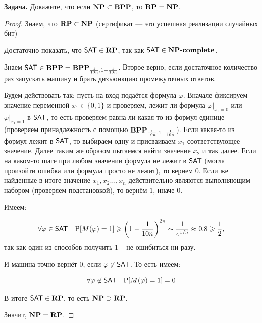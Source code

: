 \textbf{Задача.} Докажите, что если $\textbf{NP} \subset \textbf{BPP}$, то $\textbf{RP} = \textbf{NP}$.

\begin{proof}
Знаем, что $\textbf{RP} \subset \textbf{NP}$ (сертификат --- это успешная реализации случайных бит)

Достаточно показать, что $\mathsf{SAT} \in \textbf{RP}$, так как $\mathsf{SAT} \in \textbf{NP-complete}$.

Знаем $\mathsf{SAT} \in \textbf{BPP} = \textbf{BPP}_{\frac{1}{10n}, 1 - \frac{1}{10n}}$. Второе верно, если достаточное количество раз запускать машину и брать дизъюнкцию промежуточных ответов.

Будем действовать так:
пусть на вход подаётся формула $\varphi$. Вначале фиксируем значение переменной $x_1 \in \{0, 1\}$ и проверяем, лежит ли формула $\varphi|_{x_1 = 0}$ или $\varphi|_{x_1 = 1}$ в $\mathsf{SAT}$, то есть проверяем равна ли какая-то из формул единице (проверяем принадлежность с помощью $\textbf{BPP}_{\frac{1}{10n}, 1 - \frac{1}{10n}}$). Если какая-то из формул лежит в $\mathsf{SAT}$, то выбираем одну и присваиваем $x_1$ соответствующее значение. Далее таким же образом пытаемся найти значение $x_2$ и так далее. Если на каком-то шаге при любом значении формула не лежит в $\mathsf{SAT}$ (могла произойти ошибка или формула просто не лежит), то вернем $0$. Если же найденные в итоге значение $x_1,x_2\ldots,x_n$ действительно являются выполняющим набором (проверяем подстановкой), то вернём $1$, иначе $0$.

Имеем:

\[\forall \varphi \in \mathsf{SAT} \quad \mathrm{P}[M(\varphi) = 1] \geqslant \left(1-\frac{1}{10n}\right)^{2n} \sim \frac{1}{e^{1/5}} \approx 0.8 \geqslant \frac{1}{2},\]
так как один из способов получить 1 -- не ошибиться ни разу.

И машина точно вернёт 0, если $\varphi \not\in \mathsf{SAT}$. То есть имеем:

\[\forall \varphi \not\in \mathsf{SAT} \quad \mathrm{P}[M(\varphi)=1]=0\]

В итоге $\mathsf{SAT} \in \textbf{RP}$, то есть $\textbf{NP} \supset \textbf{RP}$.

Значит, $\textbf{NP} = \textbf{RP}$.
\end{proof}
